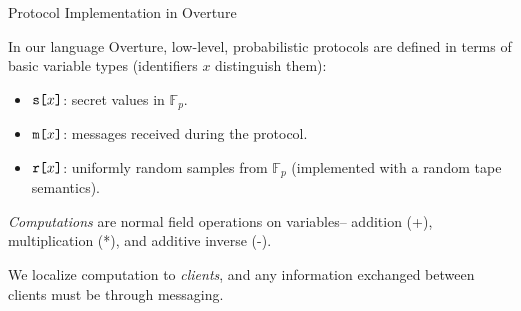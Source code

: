 \documentclass{beamer}
\begin{document}
\begin{frame}{Protocol Implementation in Overture}

  In our language Overture, low-level, probabilistic protocols are defined in
  terms of basic variable types (identifiers $x$ distinguish them):
  \begin{itemize}
  \item $\texttt{s[}x\texttt{]}$: secret values in $\mathbb{F}_p$.
  \item $\texttt{m[}x\texttt{]}$: messages received during the protocol.
  \item $\texttt{r[}x\texttt{]}$: uniformly random samples from $\mathbb{F}_p$ (implemented with
    a random tape semantics).
  \end{itemize}
  \emph{Computations} are normal field operations on variables-- addition (+), multiplication (*),
  and additive inverse (-).

  \medskip
  
  We localize computation to \emph{clients}, and any information
  exchanged between clients must be through messaging.
\end{frame}
\end{document}

